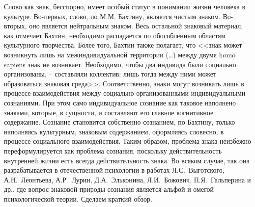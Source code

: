 Слово как знак, бесспорно, имеет особый статус в понимании жизни
человека в культуре. Во-первых, слово, по М.М. Бахтину, является чистым знаком. Во-вторых,
оно является нейтральным знаком. Весь остальной знаковый материал, как
отмечает Бахтин, необходимо распадается по обособленным областям
культурного творчества\autocite{voloshinov1993}. Более того,
Бахтин также полагает, что <<знак может возникнуть лишь на
межиндивидуальной территории (\ldots) между двумя homo sapiens знак не
возникает. Необходимо, чтобы два индивида были социально
организованы, -- составляли коллектив: лишь тогда между ними может
образоваться знаковая среда>>\autocite{voloshinov1993}. Соответственно, знаки могут
возникать лишь в процессе взаимодействия между социально
организованными индивидуальными сознаниями. При этом само
индивидуальное сознание как таковое наполнено знаками, которые, в
сущности, и составляют его главное когнитивное содержание. Сознание
становится собственно сознанием, по Бахтину, только наполняясь
культурным, знаковым содержанием, оформляясь словесно, в процессе
социального взаимодействия. Таким образом, проблема знака неизбежно
переформулируется как проблема сознания, поскольку действительность
внутренней жизни есть всегда действительность знака. Во всяком случае,
так она разрабатывается в отечественной психологии в работах Л.С.~Выготского,
А.Н.~Леонтьева, А.Р.~Лурии, Д.А.~Эльконина, Л.И.~Божович,
П.Я.~Гальперина и др., где вопрос знаковой природы сознания является
альфой и омегой психологической теории. Сделаем краткий обзор.


